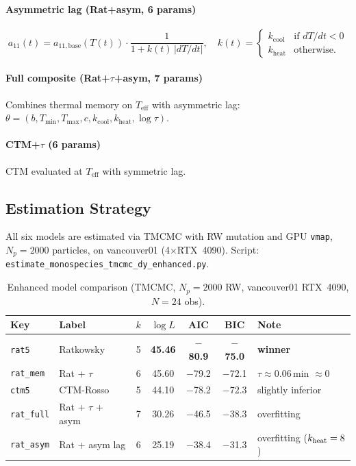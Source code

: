 \documentclass[11pt,a4paper]{article}
\begin{document}
\paragraph{Asymmetric lag (Rat+asym, 6 params)}
\begin{equation}
  a_{11}(t)=a_{11,\mathrm{base}}(T(t))\cdot
  \frac{1}{1+k(t)\,|dT/dt|},
  \quad k(t)=\begin{cases}k_{\mathrm{cool}}&\text{if }dT/dt<0\\k_{\mathrm{heat}}&\text{otherwise.}\end{cases}
\end{equation}

\paragraph{Full composite (Rat+$\tau$+asym, 7 params)}
Combines thermal memory on $T_{\mathrm{eff}}$ with asymmetric lag:
$\theta=(b,T_{\min},T_{\max},c,k_{\mathrm{cool}},k_{\mathrm{heat}},\log\tau)$.

\paragraph{CTM+$\tau$ (6 params)}
CTM evaluated at $T_{\mathrm{eff}}$ with symmetric lag.

\subsection{Estimation Strategy}
All six models are estimated via TMCMC with RW mutation and GPU \texttt{vmap},
$N_p=2000$ particles, on vancouver01 (4$\times$RTX~4090).
Script: \texttt{estimate\_monospecies\_tmcmc\_dy\_enhanced.py}.

\begin{table}[h]
\centering
\caption{Enhanced model comparison (TMCMC, $N_p=2000$ RW, vancouver01 RTX~4090, $N=24$ obs).}
\begin{tabular}{llccccl}
\toprule
Key & Label & $k$ & $\log L$ & AIC & BIC & Note \\
\midrule
\texttt{rat5}     & Ratkowsky          & 5 & \textbf{45.46} & \textbf{$-$80.9} & \textbf{$-$75.0} & \textbf{winner} \\
\texttt{rat\_mem} & Rat + $\tau$       & 6 & 45.60 & $-$79.2 & $-$72.1 & $\tau\approx0.06$\,min $\approx0$ \\
\texttt{ctm5}     & CTM-Rosso          & 5 & 44.10 & $-$78.2 & $-$72.3 & slightly inferior \\
\texttt{rat\_full}& Rat + $\tau$ + asym& 7 & 30.26 & $-$46.5 & $-$38.3 & overfitting \\
\texttt{rat\_asym}& Rat + asym lag     & 6 & 25.19 & $-$38.4 & $-$31.3 & overfitting ($k_{\rm heat}=8$) \\
\bottomrule
\end{tabular}
\label{tab:enhanced_models}
\end{table}
\end{document}
